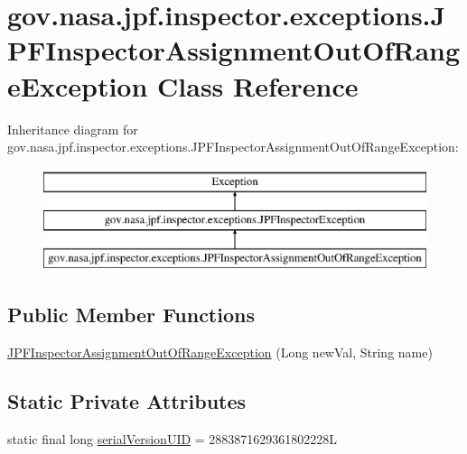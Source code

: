 \hypertarget{classgov_1_1nasa_1_1jpf_1_1inspector_1_1exceptions_1_1_j_p_f_inspector_assignment_out_of_range_exception}{}\section{gov.\+nasa.\+jpf.\+inspector.\+exceptions.\+J\+P\+F\+Inspector\+Assignment\+Out\+Of\+Range\+Exception Class Reference}
\label{classgov_1_1nasa_1_1jpf_1_1inspector_1_1exceptions_1_1_j_p_f_inspector_assignment_out_of_range_exception}
Inheritance diagram for gov.\+nasa.\+jpf.\+inspector.\+exceptions.\+J\+P\+F\+Inspector\+Assignment\+Out\+Of\+Range\+Exception\+:\begin{figure}[H]
\begin{center}
\leavevmode
\includegraphics[height=3.000000cm]{classgov_1_1nasa_1_1jpf_1_1inspector_1_1exceptions_1_1_j_p_f_inspector_assignment_out_of_range_exception}
\end{center}
\end{figure}
\subsection*{Public Member Functions}
\begin{DoxyCompactItemize}
\item 
\hyperlink{classgov_1_1nasa_1_1jpf_1_1inspector_1_1exceptions_1_1_j_p_f_inspector_assignment_out_of_range_exception_af5f62ac80e7cfc85594bf813201c36a8}{J\+P\+F\+Inspector\+Assignment\+Out\+Of\+Range\+Exception} (Long new\+Val, String name)
\end{DoxyCompactItemize}
\subsection*{Static Private Attributes}
\begin{DoxyCompactItemize}
\item 
static final long \hyperlink{classgov_1_1nasa_1_1jpf_1_1inspector_1_1exceptions_1_1_j_p_f_inspector_assignment_out_of_range_exception_a796a819ab3e77536b8ed8316631f1edb}{serial\+Version\+U\+ID} = 2883871629361802228L
\end{DoxyCompactItemize}


